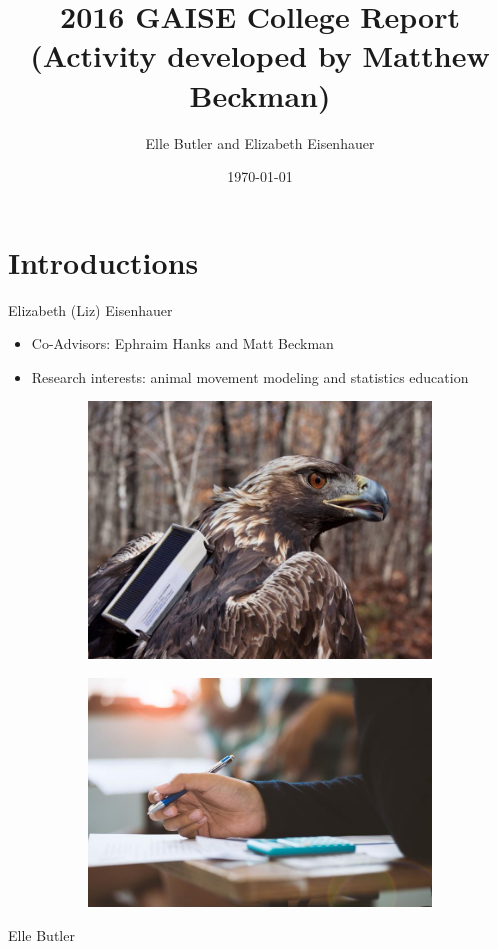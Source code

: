 \documentclass[compress]{beamer}
\title{2016 GAISE College Report \\
        \large (Activity developed by Matthew Beckman)}
\author{Elle Butler and Elizabeth Eisenhauer}
\date{\today}
\begin{document}
\begin{frame}
  \maketitle
\end{frame}

\section{Introductions}

\begin{frame}{Elizabeth (Liz) Eisenhauer}
\begin{itemize}
   \item Co-Advisors: Ephraim Hanks and Matt Beckman
   \item Research interests: animal movement modeling and statistics education
\end{itemize}

\begin{figure}
\centering
\begin{subfigure}
  \centering
  \includegraphics[width=.4\linewidth]{images/800.jpeg}
\end{subfigure}
\begin{subfigure}
  \centering
  \includegraphics[width=.4\linewidth]{images/ed.jpeg}
\end{subfigure}
\end{figure}

\end{frame}


\begin{frame}{Elle Butler}
    
\end{frame}
\end{document}
